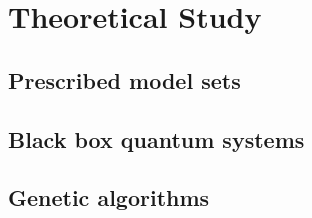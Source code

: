 \part{Theoretical Study}\label{part:theoretical_study}
    \chapter{Prescribed model sets}\label{chapter:lattices}
        
    \chapter{Black box quantum systems}\label{chapter:black_box}
        
    \chapter{Genetic algorithms}\label{chapter:ga}
        

%         
%         
    
%         




